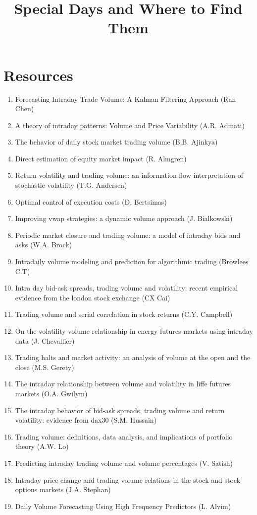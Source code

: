 \documentclass[11pt]{article}
\title{Special Days and Where to Find Them}
\date{}                                           %
\begin{document}
\maketitle

\section*{Resources}

\begin{enumerate}
\setlength{\itemsep}{0pt}
  \setlength{\parskip}{0pt}
\item Forecasting Intraday Trade Volume: A Kalman Filtering Approach (Ran Chen)
\item A theory of intraday patterns: Volume and Price Variability (A.R. Admati)
\item The behavior of daily stock market trading volume (B.B. Ajinkya)
\item Direct estimation of equity market impact (R. Almgren)
\item Return volatility and trading volume: an information flow interpretation of stochastic volatility (T.G. Andersen)
\item Optimal control of execution costs (D. Bertsimas)
\item Improving vwap strategies: a dynamic volume approach (J. Bialkowski)
\item Periodic market closure and trading volume: a model of intraday bids and asks (W.A. Brock)
\item Intradaily volume modeling and prediction for algorithmic trading (Browlees C.T)
\item Intra day bid-ask spreads, trading volume and volatility: recent empirical evidence from the london stock exchange (CX Cai)
\item Trading volume and serial correlation in stock returns (C.Y. Campbell)
\item On the volatility-volume relationship in energy futures markets using intraday data (J. Chevallier)
\item Trading halts and market activity: an analysis of volume at the open and the close (M.S. Gerety)
\item The intraday relationship between volume and volatility in liffe futures markets (O.A. Gwilym)
\item The intraday behavior of bid-ask spreads, trading volume and return volatility: evidence from dax30 (S.M. Hussain)
\item Trading volume: definitions, data analysis, and implications of portfolio theory (A.W. Lo)
\item Predicting intraday trading volume and volume percentages (V. Satish)
\item Intraday price change and trading volume relations in the stock and stock options markets (J.A. Stephan)
\item Daily Volume Forecasting Using High Frequency Predictors (L. Alvim)

\end{enumerate}
\end{document}
